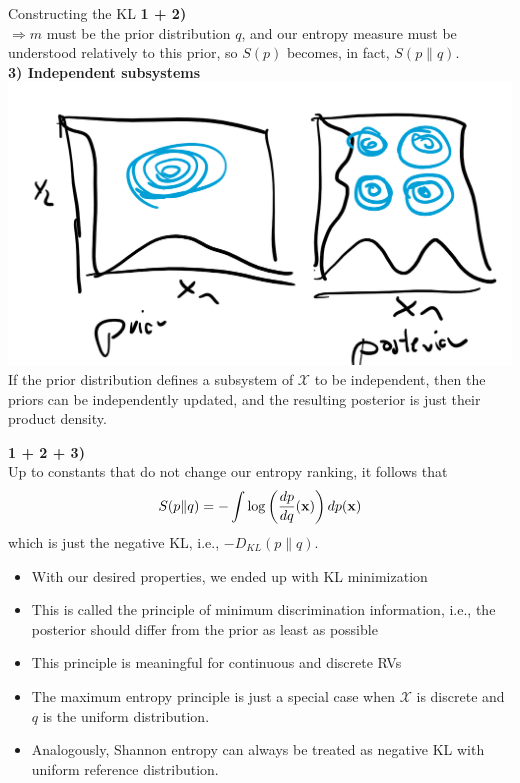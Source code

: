 \documentclass[11pt,compress,t,notes=noshow, xcolor=table]{beamer}
\begin{document}
\begin{vbframe}{Constructing the KL}
    \textbf{1 + 2)} 
    \\ $\Rightarrow m$ must be the prior distribution $q$, and our entropy measure must be understood relatively to this prior, so $S(p)$ becomes, in fact, $S(p\|q).$\\
    \lz 
    \textbf{3) Independent subsystems} \\
    \includegraphics[width=0.6\linewidth]{slides/information-theory/figure_man/kl_me_indep_sub.png} \\
    If the prior distribution defines a subsystem of $\mathcal{X}$ to be independent, then the priors can be independently updated, and the resulting posterior is just their product density.
    
    \framebreak

    \textbf{1 + 2 + 3)} \\
    Up to constants that do not change our entropy ranking, it follows that 
    $$S(p\|q) = - \int \log\left(\frac{dp}{dq}(\mathbf{x})\right)dp(\mathbf{x})$$
    which is just the negative KL, i.e., $-D_{KL}(p\|q).$

    \begin{itemize}
        \item With our desired properties, we ended up with KL minimization
        \item This is called the principle of minimum discrimination information, i.e., the posterior should differ from the prior as least as possible
        \item This principle is meaningful for continuous and discrete RVs
        \item The maximum entropy principle is just a special case when $\mathcal{X}$ is discrete and $q$ is the uniform distribution.
        \item Analogously, Shannon entropy can always be treated as negative KL  with uniform reference distribution.
    \end{itemize}
    
\end{vbframe}
\endlecture
\end{document}
